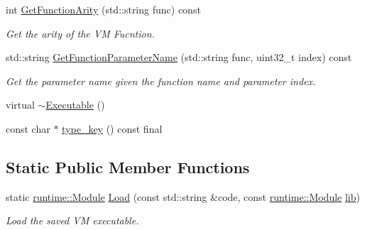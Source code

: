 \begin{DoxyCompactItemize}
int \hyperlink{classtvm_1_1runtime_1_1vm_1_1Executable_a3a970ab4d5a437c367f960824e5df685}{Get\+Function\+Arity} (std\+::string func) const 
\begin{DoxyCompactList}\small\item\em Get the arity of the VM Fucntion. \end{DoxyCompactList}\item 
std\+::string \hyperlink{classtvm_1_1runtime_1_1vm_1_1Executable_a8f438b473ed27c3fe3a1bc95fbb79b69}{Get\+Function\+Parameter\+Name} (std\+::string func, uint32\+\_\+t index) const 
\begin{DoxyCompactList}\small\item\em Get the parameter name given the function name and parameter index. \end{DoxyCompactList}\item 
virtual \hyperlink{classtvm_1_1runtime_1_1vm_1_1Executable_a99432cdf9ce74de84f08feec9b08ed5e}{$\sim$\+Executable} ()
\item 
const char $\ast$ \hyperlink{classtvm_1_1runtime_1_1vm_1_1Executable_aef4f3663ee57fcbdf2d775f4dbbe79dc}{type\+\_\+key} () const final
\end{DoxyCompactItemize}
\subsection*{Static Public Member Functions}
\begin{DoxyCompactItemize}
\item 
static \hyperlink{classtvm_1_1runtime_1_1Module}{runtime\+::\+Module} \hyperlink{classtvm_1_1runtime_1_1vm_1_1Executable_a4eeb4c5cfb8830d32d96756fd1dc58d0}{Load} (const std\+::string \&code, const \hyperlink{classtvm_1_1runtime_1_1Module}{runtime\+::\+Module} \hyperlink{classtvm_1_1runtime_1_1vm_1_1Executable_a0d69e974364e3f2eb643c25b77c74015}{lib})
\begin{DoxyCompactList}\small\item\em Load the saved VM executable. \end{DoxyCompactList}\end{DoxyCompactItemize}
